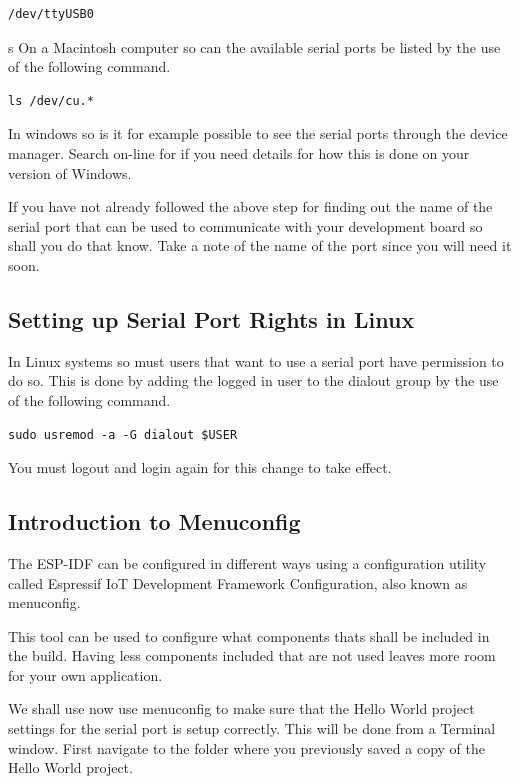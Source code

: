 \documentclass{tufte-book}
\begin{document}
\begin{lstlisting}
/dev/ttyUSB0
\end{lstlisting}
s
On a Macintosh computer so can the available serial ports be listed by the use of the following command.

\begin{lstlisting}
ls /dev/cu.*
\end{lstlisting}

In windows so is it for example possible to see the serial ports through the device manager. Search on-line for  if you need details for how this is done on your version of Windows.

If you have not already followed the above step for finding out the name of the serial port that can be used to communicate with your development board so shall you do that know. Take a note of the name of the port since you will need it soon.

\subsection{Setting up Serial Port Rights in Linux}
In Linux systems so must users that want to use a serial port have permission to do so. This is done by adding the logged in user to the dialout group by the use of the following command.

\begin{lstlisting}
sudo usremod -a -G dialout $USER
\end{lstlisting}

You must logout and login again for this change to take effect.

\subsection{Introduction to Menuconfig}
The ESP-IDF can be configured in different ways using a configuration utility called Espressif IoT Development Framework Configuration, also known as menuconfig.

This tool can be used to configure what components thats shall be included in the build. Having less components included that are not used leaves more room for your own application.

We shall use now use menuconfig to make sure that the Hello World project settings for the serial port is setup correctly. This will be done from a Terminal window. First navigate to the folder where you previously saved a copy of the Hello World project.
\end{document}
